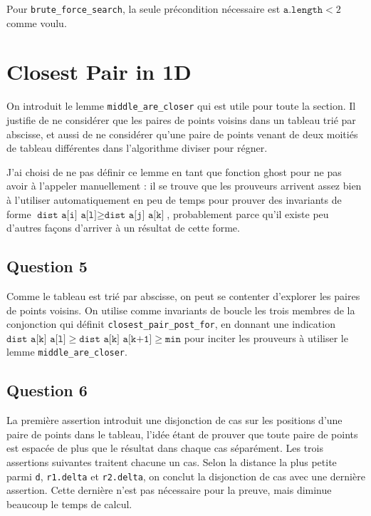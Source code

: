\documentclass[11pt, openany, a4paper]{article}
\newcommand{\alength}{\texttt{a.length} }
\newcommand{\dist}{\texttt{dist} }
\newcommand{\clofor}{\texttt{closest\_pair\_post\_for}}
\begin{document}
Pour \texttt{brute\_force\_search}, la seule précondition nécessaire est $\alength < 2$ comme voulu. 

\section{Closest Pair in 1D}

On introduit le lemme \texttt{middle\_are\_closer} qui est utile pour toute la section. Il justifie de ne considérer que les paires de points voisins dans un tableau trié par abscisse, et aussi de ne considérer qu'une paire de points venant de deux moitiés de tableau différentes dans l'algorithme diviser pour régner.

J'ai choisi de ne pas définir ce lemme en tant que fonction ghost pour ne pas avoir à l'appeler manuellement : il se trouve que les prouveurs arrivent assez bien à l'utiliser automatiquement en peu de temps pour prouver des invariants de forme $\dist \texttt{ a[i] a[l]} \geq \dist \texttt{ a[j] a[k]}$, probablement parce qu'il existe peu d'autres façons d'arriver à un résultat de cette forme.

\subsection*{Question 5}

Comme le tableau est trié par abscisse, on peut se contenter d'explorer les paires de points voisins. On utilise comme invariants de boucle les trois membres de la conjonction qui définit \clofor, en donnant une indication $\dist \texttt{ a[k] a[l]} \geq \dist \texttt{ a[k] a[k+1]} \geq \texttt{min}$ pour inciter les prouveurs à utiliser le lemme \texttt{middle\_are\_closer}.

\subsection*{Question 6}

La première assertion introduit une disjonction de cas sur les positions d'une paire de points dans le tableau, l'idée étant de prouver que toute paire de points est espacée de plus que le résultat dans chaque cas séparément. Les trois assertions suivantes traitent chacune un cas. Selon la distance la plus petite parmi \texttt{d}, \texttt{r1.delta} et \texttt{r2.delta}, on conclut la disjonction de cas avec une dernière assertion. Cette dernière n'est pas nécessaire pour la preuve, mais diminue beaucoup le temps de calcul.
\end{document}
